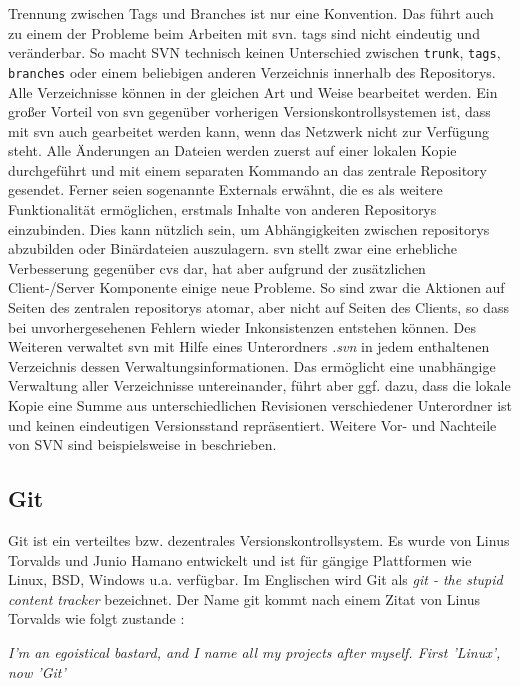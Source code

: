 Trennung zwischen Tags und Branches ist nur eine Konvention. Das führt auch zu
einem der Probleme beim Arbeiten mit \acrlong{svn}. \glspl{tag} sind nicht
eindeutig und veränderbar. So macht SVN technisch keinen Unterschied zwischen
\texttt{trunk}, \texttt{tags}, \texttt{branches} oder einem beliebigen anderen
Verzeichnis innerhalb des Repositorys. Alle Verzeichnisse können in der
gleichen Art und Weise bearbeitet werden. Ein großer Vorteil von \acrshort{svn}
gegenüber vorherigen Versionskontrollsystemen ist, dass mit \acrshort{svn} auch
gearbeitet werden kann, wenn das Netzwerk nicht zur Verfügung steht. Alle
Änderungen an Dateien werden zuerst auf einer lokalen Kopie durchgeführt und
mit einem separaten Kommando an das zentrale Repository gesendet. Ferner seien
sogenannte Externals erwähnt, die es als weitere Funktionalität ermöglichen,
erstmals Inhalte von anderen Repositorys einzubinden. Dies kann nützlich sein,
um Abhängigkeiten zwischen \glspl{repository} abzubilden oder Binärdateien
auszulagern. \acrshort{svn} stellt zwar eine erhebliche Verbesserung gegenüber
\acrshort{cvs} dar, hat aber aufgrund der zusätzlichen Client-/Server
Komponente einige neue Probleme. So sind zwar die Aktionen auf Seiten des
zentralen \glspl{repository} atomar, aber nicht auf Seiten des Clients, so dass
bei unvorhergesehenen Fehlern wieder Inkonsistenzen entstehen können. Des
Weiteren verwaltet \acrshort{svn} mit Hilfe eines Unterordners \textit{.svn} in
jedem enthaltenen Verzeichnis dessen Verwaltungsinformationen. Das
ermöglicht eine unabhängige Verwaltung aller Verzeichnisse untereinander, führt
aber ggf. dazu, dass die lokale Kopie eine Summe aus unterschiedlichen
Revisionen verschiedener Unterordner ist und keinen eindeutigen Versionsstand
repräsentiert. Weitere Vor- und Nachteile von SVN sind beispielsweise in
\cite[S.~383-385]{cd} beschrieben.

\subsection{Git}\label{git}
Git ist ein verteiltes bzw. dezentrales Versionskontrollsystem. Es wurde von Linus
Torvalds und Junio Hamano entwickelt und ist für gängige Plattformen wie Linux,
BSD, Windows u.a. verfügbar. Im Englischen wird Git als \textit{git - the
stupid content tracker} bezeichnet. Der Name \acrshort{git} kommt nach einem
Zitat von Linus Torvalds wie folgt zustande \cite{link:gitfaq}:

\begin{center}
\textit{\glqq{}I'm an egoistical bastard, and I name all my projects after
myself. First 'Linux', now 'Git'\grqq{}}\\
\end{center}

